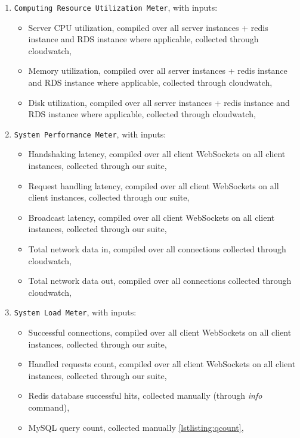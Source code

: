 \documentclass{uvamscse}
\begin{document}
\begin{enumerate}
  \item \texttt{Computing Resource Utilization Meter}, with inputs:
    \begin{itemize}
      \item Server CPU utilization, compiled over all server instances + redis instance and RDS instance where applicable, collected through cloudwatch,
      \item Memory utilization, compiled over all server instances + redis instance and RDS instance where applicable, collected through cloudwatch,
      \item Disk utilization, compiled over all server instances + redis instance and RDS instance where applicable, collected through cloudwatch,
    \end{itemize}
  \item \texttt{System Performance Meter}, with inputs:
    \begin{itemize}
      \item Handshaking latency, compiled over all client WebSockets on all client instances, collected through our suite,
      \item Request handling latency, compiled over all client WebSockets on all client instances, collected through our suite,
      \item Broadcast latency, compiled over all client WebSockets on all client instances, collected through our suite,
      \item Total network data in, compiled over all connections collected through cloudwatch,
      \item Total network data out, compiled over all connections collected through cloudwatch,
    \end{itemize}
  \item \texttt{System Load Meter}, with inputs:
    \begin{itemize}
      \item Successful connections, compiled over all client WebSockets on all client instances, collected through our suite,
      \item Handled requests count, compiled over all client WebSockets on all client instances, collected through our suite,
      \item Redis database successful hits, collected manually (through \textit{info} command),
      \item MySQL query count, collected manually \ref{lstlisting:qcount},
    \end{itemize}

\end{enumerate}
\end{document}
